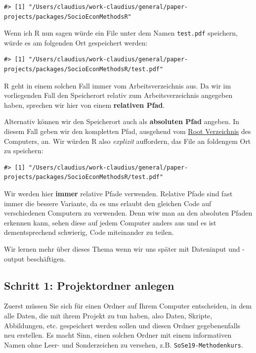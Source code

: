 \documentclass[]{tufte-book}
\begin{document}
\begin{verbatim}
#> [1] "/Users/claudius/work-claudius/general/paper-projects/packages/SocioEconMethodsR"
\end{verbatim}

Wenn ich R nun sagen würde ein File unter dem Namen \texttt{test.pdf}
speichern, würde es am folgenden Ort gespeichert werden:

\begin{verbatim}
#> [1] "/Users/claudius/work-claudius/general/paper-projects/packages/SocioEconMethodsR/test.pdf"
\end{verbatim}

R geht in einem solchen Fall immer vom Arbeitsverzeichnis aus. Da wir im
vorliegenden Fall den Speicherort relativ zum Arbeitsverzeichnis
angegeben haben, sprechen wir hier von einem \textbf{relativen Pfad}.

Alternativ können wir den Speicherort auch als \textbf{absoluten Pfad}
angeben. In diesem Fall geben wir den kompletten Pfad, ausgehend vom
\href{https://de.wikipedia.org/wiki/Stammverzeichnis}{Root Verzeichnis}
des Computers, an. Wir würden R also \emph{explizit} auffordern, das
File an foldengem Ort zu speichern:

\begin{verbatim}
#> [1] "/Users/claudius/work-claudius/general/paper-projects/packages/SocioEconMethodsR/test.pdf"
\end{verbatim}

Wir werden hier \textbf{immer} relative Pfade verwenden. Relative Pfade
sind fast immer die bessere Variante, da es uns erlaubt den gleichen
Code auf verschiedenen Computern zu verwenden. Denn wiw man an den
absoluten Pfaden erkennen kann, sehen diese auf jedem Computer anders
aus und es ist dementsprechend schwierig, Code miteinander zu teilen.

Wir lernen mehr über dieses Thema wenn wir uns später mit Dateninput und
-output beschäftigen.

\subsection{Schritt 1: Projektordner
anlegen}\label{schritt-1-projektordner-anlegen}

Zuerst müssen Sie sich für einen Ordner auf Ihrem Computer entscheiden,
in dem alle Daten, die mit ihrem Projekt zu tun haben, also Daten,
Skripte, Abbildungen, etc. gespeichert werden sollen und diesen Ordner
gegebenenfalls neu erstellen. Es macht Sinn, einen solchen Ordner mit
einem informativen Namen ohne Leer- und Sonderzeichen zu versehen, z.B.
\texttt{SoSe19-Methodenkurs}.
\end{document}

